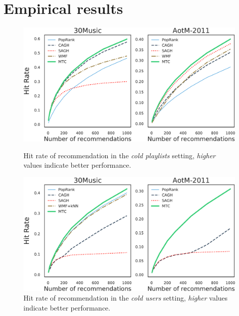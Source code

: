 \clearpage
\newpage
\onecolumn

\section{Empirical results}

%
%
%

\begin{figure}[!h]
    \centering
    \begin{minipage}{0.45\textwidth}
        \centering
        \includegraphics[width=\linewidth]{fig/hr3.pdf}
        \caption{Hit rate of recommendation in the \emph{cold playlists} setting, \emph{higher} values indicate better performance.}
        \label{fig:hr3}
    \end{minipage}\hspace{15pt}
    \begin{minipage}{0.45\textwidth}
        \centering
        \includegraphics[width=\linewidth]{fig/hr4.pdf}
        \caption{Hit rate of recommendation in the \emph{cold users} setting, \emph{higher} values indicate better performance.}
        \label{fig:hr4}
    \end{minipage}
\end{figure}

